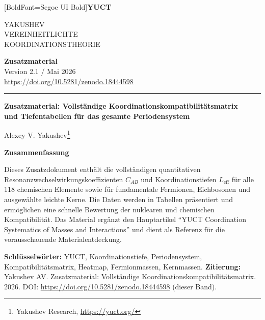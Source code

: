 \documentclass[11pt,a4paper]{article}
\newcommand{\makeheader}{%
	\noindent
	\begin{minipage}{0.17\textwidth}
		\raggedright
		{\fontspec{Segoe UI}[BoldFont=Segoe UI Bold]\bfseries\color{skyblue}\fontsize{46}{46}\selectfont YUCT}%
	\end{minipage}%
	\hspace{30pt}
	\begin{minipage}{0.32\textwidth}
		\raggedright
		{\sffamily\fontsize{11}{13}\selectfont YAKUSHEV\\ VEREINHEITLICHTE\\ KOORDINATIONSTHEORIE}%
	\end{minipage}%
	\hfill
	\begin{minipage}{0.38\textwidth}
		\raggedleft
		{\sffamily\bfseries Zusatzmaterial}\\ 
		{\sffamily Version 2.1 / Mai 2026}\\ 
		{\sffamily\footnotesize \url{https://doi.org/10.5281/zenodo.18444598}}%
	\end{minipage}
	\par\vspace{5pt}
	\noindent\textcolor{gold}{\rule{\textwidth}{1.6pt}}
	\par\vspace{0pt}
}
\begin{document}
	\thispagestyle{firstpage}
	\makeheader
	
	\vspace{0cm}
	{\LARGE\bfseries Zusatzmaterial: Vollständige Koordinationskompatibilitätsmatrix \\ 
		\Large und Tiefentabellen für das gesamte Periodensystem \par}
	\vspace{0.2cm}
	
	{\large Alexey V. Yakushev\footnote{Yakushev Research, \url{https://yuct.org/}}} \\
	\vspace{0.0cm}
	
	{\color{darkblue}\textbf{\LARGE Zusammenfassung}} \par
	{\large
		\noindent
		Dieses Zusatzdokument enthält die vollständigen quantitativen Resonanzwechselwirkungskoeffizienten \(C_{AB}\) und Koordinationstiefen \(L_{\mathrm{eff}}\) für alle 118 chemischen Elemente sowie für fundamentale Fermionen, Eichbosonen und ausgewählte leichte Kerne. Die Daten werden in Tabellen präsentiert und ermöglichen eine schnelle Bewertung der nuklearen und chemischen Kompatibilität. Das Material ergänzt den Hauptartikel ``YUCT Coordination Systematics of Masses and Interactions'' und dient als Referenz für die vorausschauende Materialentdeckung.
	}
	
	\vspace{0.1cm}
	\noindent
	{\color{darkblue}\textbf{Schlüsselwörter:}} YUCT, Koordinationstiefe, Periodensystem, Kompatibilitätsmatrix, Heatmap, Fermionmassen, Kernmassen.
	\vspace{0.1cm}
	\noindent
	{\color{darkblue}\textbf{Zitierung:}} Yakushev AV. Zusatzmaterial: Vollständige Koordinationskompatibilitätsmatrix. 2026. DOI: \url{https://doi.org/10.5281/zenodo.18444598} (dieser Band).
	
	\vspace{0.4cm}
	
\end{document}
